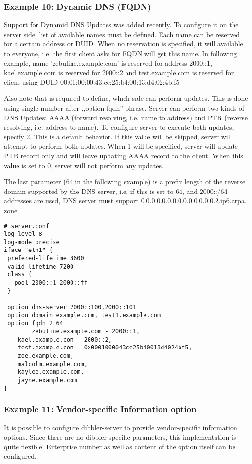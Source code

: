 \subsubsection{Example 10: Dynamic DNS (FQDN)}
\label{example-server-fqdn}

Support for Dynamid DNS Updates was added recently. To configure it
on the server side, list of available names must be defined. Each name
can be reserved for a certain address or DUID. When no reservation is
specified, it will available to everyone, i.e. the first client asks
for FQDN will get this name. In following example, name 'zebuline.example.com' is
reserved for address 2000::1, kael.example.com is reserved for 2000::2 and
test.example.com is reserved for client using DUID
00:01:00:00:43:ce:25:b4:00:13:d4:02:4b:f5. 

Also note that is required to define, which side can perform updates.
This is done using single number after ,,option fqdn'' phrase. Server
can perform two kinds of DNS Updates: AAAA (forward resolving,
i.e. name to address) and PTR (reverse resolving, i.e. address to
name). To configure server to execute both updates, specify 2. This is
a default behavior. If this value will be skipped, server will attempt
to perform both updates. When 1 will be specified, server will update
PTR record only and will leave updating AAAA record to the
client. When this value is set to 0, server will not perform any
updates.

The last parameter (64 in the following example) is a prefix length of
the reverse domain supported by the DNS server, i.e. if this is set to
64, and 2000::/64 addresses are used, DNS server must support
0.0.0.0.0.0.0.0.0.0.0.0.0.0.2.ip6.arpa. zone.

\begin{lstlisting}
# server.conf
log-level 8
log-mode precise
iface "eth1" {
 prefered-lifetime 3600
 valid-lifetime 7200
 class {
   pool 2000::1-2000::ff
 }

 option dns-server 2000::100,2000::101
 option domain example.com, test1.example.com
 option fqdn 2 64
        zebuline.example.com - 2000::1,
	kael.example.com - 2000::2,
	test.example.com - 0x0001000043ce25b40013d4024bf5,
	zoe.example.com,
	malcolm.example.com,
	kaylee.example.com,
	jayne.example.com
}
\end{lstlisting}

\subsubsection{Example 11: Vendor-specific Information option}
\label{example-server-vendor-spec}
It is possible to configure dibbler-server to provide vendor-specific
information options. Since there are no dibbler-specific parameters,
this implementation is quite flexible. Enterprise number as well as
content of the option itself can be configured. 

